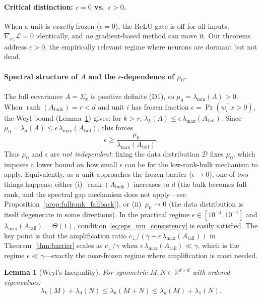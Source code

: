 \documentclass{article}
\providecommand{\R}{\mathbb{R}}
\DeclareMathOperator{\rank}{rank}
\theoremstyle{plain}
\newtheorem{lemma}{Lemma}
\theoremstyle{definition}
\theoremstyle{remark}
\begin{document}
\paragraph{Critical distinction: $\epsilon = 0$ vs.\ $\epsilon > 0$.}
When a unit is \emph{exactly} frozen ($\epsilon = 0$), the ReLU gate is off for all inputs, $\nabla_{w_i}\mathcal{L} = 0$ identically, and \emph{no} gradient-based method can move it. Our theorems address $\epsilon > 0$, the empirically relevant regime where neurons are dormant but not dead.

\paragraph{Spectral structure of $A$ and the $\epsilon$-dependence of $\mu_0$.}
The full covariance $A = \Sigma_x$ is positive definite (D1), so $\mu_0 = \lambda_{\min}(A) > 0$. When $\rank(A_{\mathrm{bulk}}) = r < d$ and unit $i$ has frozen fraction $\epsilon = \Pr(w_i^\top x > 0)$, the Weyl bound (Lemma~\ref{lem:weyl}) gives: for $k > r$, $\lambda_k(A) \leq \epsilon\,\lambda_{\max}(A_{\mathrm{tail}})$. Since $\mu_0 = \lambda_d(A) \leq \epsilon\,\lambda_{\max}(A_{\mathrm{tail}})$, this forces
\begin{equation}
\label{eq:eps_mu_consistency}
    \epsilon \geq \frac{\mu_0}{\lambda_{\max}(A_{\mathrm{tail}})}.
\end{equation}
Thus $\mu_0$ and $\epsilon$ are \emph{not independent}: fixing the data distribution $\mathcal{D}$ fixes $\mu_0$, which imposes a lower bound on how small $\epsilon$ can be for the low-rank-bulk mechanism to apply. Equivalently, as a unit approaches the frozen barrier ($\epsilon \to 0$), one of two things happens: either (i)~$\rank(A_{\mathrm{bulk}})$ increases to $d$ (the bulk becomes full-rank, and the spectral gap mechanism does not apply---see Proposition~\ref{prop:fullrank_fallback}), or (ii)~$\mu_0 \to 0$ (the data distribution is itself degenerate in some directions). In the practical regime $\epsilon \in [10^{-4}, 10^{-1}]$ and $\lambda_{\max}(A_{\mathrm{tail}}) = \Theta(1)$, condition~\eqref{eq:eps_mu_consistency} is easily satisfied. The key point is that the amplification ratio $c_\perp/(\gamma + \epsilon\,\lambda_{\max}(A_{\mathrm{tail}}))$ in Theorem~\ref{thm:barrier} scales as $c_\perp/\gamma$ when $\epsilon\,\lambda_{\max}(A_{\mathrm{tail}}) \ll \gamma$, which is the regime $\epsilon \ll \gamma$---exactly the near-frozen regime where amplification is most needed.

\begin{lemma}[Weyl's Inequality]
\label{lem:weyl}
For symmetric $M, N \in \R^{d \times d}$ with ordered eigenvalues:
\begin{equation}
    \lambda_k(M) + \lambda_d(N) \leq \lambda_k(M + N) \leq \lambda_k(M) + \lambda_1(N).
\end{equation}
\end{lemma}
\end{document}
